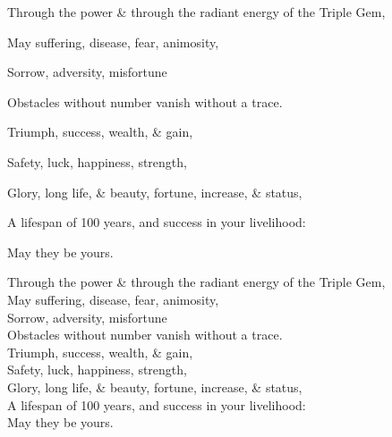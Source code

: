 \begin{english-verses}
\begin{english-hang-first-line}
  Through the power \& through the radiant energy of the Triple Gem,\\
\end{english-hang-first-line}
\begin{english-hang-together-verses}
  May suffering, disease, fear, animosity,\\
\end{english-hang-together-verses}
\begin{english-hang-together-verses}
  Sorrow, adversity, misfortune\\
\end{english-hang-together-verses}
\begin{english-hang-together-verses}
  Obstacles without number vanish without a trace.\\
\end{english-hang-together-verses}
\begin{english-hang-together-verses}
  Triumph, success, wealth, \& gain,\\
\end{english-hang-together-verses}
\begin{english-hang-together-verses}
  Safety, luck, happiness, strength,\\
\end{english-hang-together-verses}
\begin{english-hang-together-verses}
  Glory, long life, \& beauty, fortune, increase, \& status,\\
\end{english-hang-together-verses}
\begin{english-hang-together-verses}
  A lifespan of 100 years, and success in your livelihood:\\
\end{english-hang-together-verses}
\begin{english-hang-together-verses}
  May they be yours.
\end{english-hang-together-verses}
\end{english-verses}

\else

\begin{english-verses}
  Through the power \& through the radiant energy of the Triple Gem,\\
  May suffering, disease, fear, animosity,\\
  Sorrow, adversity, misfortune\\
  Obstacles without number vanish without a trace.\\
  Triumph, success, wealth, \& gain,\\
  Safety, luck, happiness, strength,\\
  Glory, long life, \& beauty, fortune, increase, \& status,\\
  A lifespan of 100 years, and success in your livelihood:\\
  May they be yours.
\end{english-verses}

